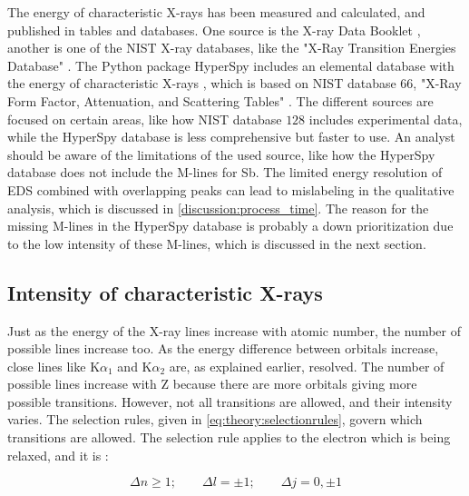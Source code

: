 The energy of characteristic X-rays has been measured and calculated, and published in tables and databases.
One source is the X-ray Data Booklet \cite{thompson_x-ray_2004}, another is one of the NIST X-ray databases, like the "X-Ray Transition Energies Database" \cite{nist_xraydatabase}.
The Python package HyperSpy includes an elemental database with the energy of characteristic X-rays \cite{hyperspy_1.7.1}, which is based on NIST database $66$, "X-Ray Form Factor, Attenuation, and Scattering Tables" \cite{nist_xraydatabase_hyperspy}.
The different sources are focused on certain areas, like how NIST database $128$ \cite{nist_xraydatabase} includes experimental data, while the HyperSpy database is less comprehensive but faster to use.
An analyst should be aware of the limitations of the used source, like how the HyperSpy database does not include the M-lines for Sb.
The limited energy resolution of EDS combined with overlapping peaks can lead to mislabeling in the qualitative analysis, which is discussed in \cref{discussion:process_time}.
The reason for the missing M-lines in the HyperSpy database is probably a down prioritization due to the low intensity of these M-lines, which is discussed in the next section.



\subsection{Intensity of characteristic X-rays}
\label{theory:xray_formation:intensity}

Just as the energy of the X-ray lines increase with atomic number, the number of possible lines increase too.
As the energy difference between orbitals increase, close lines like K$\alpha_1$ and K$\alpha_2$ are, as explained earlier, resolved.
The number of possible lines increase with Z because there are more orbitals giving more possible transitions.
However, not all transitions are allowed, and their intensity varies.
The selection rules, given in \cref{eq:theory:selectionrules}, govern which transitions are allowed.
The selection rule applies to the electron which is being relaxed, and it is \cite[Sec. 8.2.2.2]{hollas_modern_2004}:

\begin{equation}
    \label{eq:theory:selectionrules}
    \Delta n \ge 1;\qquad \Delta l  = \pm 1;\qquad \Delta j = 0, \pm 1
\end{equation}

